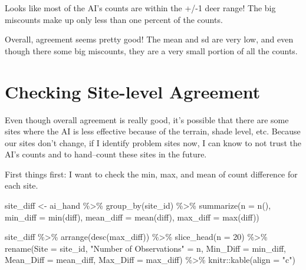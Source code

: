 \documentclass[
]{book}
\newenvironment{Shaded}{\begin{snugshade}}{\end{snugshade}}
\newcommand{\AttributeTok}[1]{\textcolor[rgb]{0.77,0.63,0.00}{#1}}
\newcommand{\DecValTok}[1]{\textcolor[rgb]{0.00,0.00,0.81}{#1}}
\newcommand{\FunctionTok}[1]{\textcolor[rgb]{0.00,0.00,0.00}{#1}}
\newcommand{\NormalTok}[1]{#1}
\newcommand{\OtherTok}[1]{\textcolor[rgb]{0.56,0.35,0.01}{#1}}
\newcommand{\SpecialCharTok}[1]{\textcolor[rgb]{0.00,0.00,0.00}{#1}}
\newcommand{\StringTok}[1]{\textcolor[rgb]{0.31,0.60,0.02}{#1}}
\begin{document}
Looks like most of the AI's counts are within the +/-1 deer range! The big miscounts make up only less than one percent of the counts.

Overall, agreement seems pretty good! The mean and sd are very low, and even though there some big miscounts, they are a very small portion of all the counts.

\hypertarget{site}{%
\chapter{Checking Site-level Agreement}\label{site}}

Even though overall agreement is really good, it's possible that there are some sites where the AI is less effective because of the terrain, shade level, etc. Because our sites don't change, if I identify problem sites now, I can know to not trust the AI's counts and to hand--count these sites in the future.

First things first: I want to check the min, max, and mean of count difference for each site.

\begin{Shaded}
\begin{Highlighting}[]
\NormalTok{site\_diff }\OtherTok{\textless{}{-}}\NormalTok{ ai\_hand }\SpecialCharTok{\%\textgreater{}\%} 
  \FunctionTok{group\_by}\NormalTok{(site\_id) }\SpecialCharTok{\%\textgreater{}\%} 
  \FunctionTok{summarize}\NormalTok{(}\AttributeTok{n =} \FunctionTok{n}\NormalTok{(),}
            \AttributeTok{min\_diff =} \FunctionTok{min}\NormalTok{(diff),}
            \AttributeTok{mean\_diff =} \FunctionTok{mean}\NormalTok{(diff),}
            \AttributeTok{max\_diff =} \FunctionTok{max}\NormalTok{(diff))}

\NormalTok{site\_diff }\SpecialCharTok{\%\textgreater{}\%}
  \FunctionTok{arrange}\NormalTok{(}\FunctionTok{desc}\NormalTok{(max\_diff)) }\SpecialCharTok{\%\textgreater{}\%}
  \FunctionTok{slice\_head}\NormalTok{(}\AttributeTok{n =} \DecValTok{20}\NormalTok{) }\SpecialCharTok{\%\textgreater{}\%}
  \FunctionTok{rename}\NormalTok{(}\AttributeTok{Site =}\NormalTok{ site\_id,}
         \StringTok{"Number of Observations"} \OtherTok{=}\NormalTok{ n,}
         \AttributeTok{Min\_Diff =}\NormalTok{ min\_diff,}
         \AttributeTok{Mean\_Diff =}\NormalTok{ mean\_diff,}
         \AttributeTok{Max\_Diff =}\NormalTok{ max\_diff) }\SpecialCharTok{\%\textgreater{}\%}
\NormalTok{  knitr}\SpecialCharTok{::}\FunctionTok{kable}\NormalTok{(}\AttributeTok{align =} \StringTok{"c"}\NormalTok{)}
\end{Highlighting}
\end{Shaded}
\end{document}
